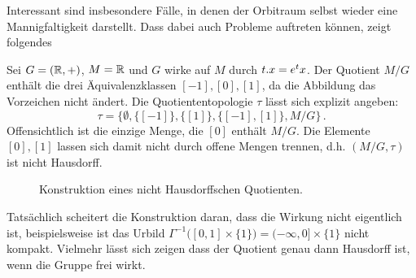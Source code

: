 Interessant sind insbesondere Fälle, in denen der Orbitraum selbst wieder eine
Mannigfaltigkeit darstellt. Dass dabei auch Probleme auftreten können, zeigt
folgendes 
\begin{beispiel} Sei $G=(\mathbb{R},+)$, $M=\mathbb{R}$ und $G$ wirke auf
$M$ durch $t . x=e^tx$.
Der Quotient $M/G$ enthält die drei Äquivalenzklassen $[-1],[0],[1]$, da die
Abbildung das Vorzeichen nicht ändert.
Die Quotiententopologie $\tau$ lässt sich explizit angeben:
\begin{equation}
\tau =\big\{\emptyset,\{[-1]\},\{[1]\},\{[-1],[1]\},M/G\big\}\,.
\end{equation}
Offensichtlich ist die einzige Menge, die $[0]$ enthält $M/G$. Die Elemente
$[0],[1]$ lassen sich damit nicht durch offene Mengen trennen, d.h. $(M/G,\tau)$
ist nicht Hausdorff.
\begin{figure}[!htbp]
\centering
{}
\caption{Konstruktion eines nicht Hausdorffschen Quotienten.}
\end{figure}
\end{beispiel}
Tatsächlich scheitert die Konstruktion daran, dass die Wirkung nicht eigentlich
ist, beispielsweise ist das Urbild $\Gamma^{-1}\big([0,1]\times
\{1\}\big)=(-\infty,0]\times \{1\}$ nicht kompakt.
Vielmehr lässt sich zeigen dass der Quotient genau dann Hausdorff ist, wenn die
Gruppe frei wirkt.

